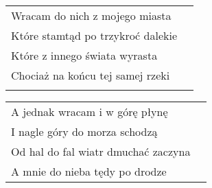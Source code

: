 \documentclass[a5paper]{article}
\begin{document}
\noindent
\begin{tabular}{@{}p{7.50cm}p{3cm}@{}}
Wracam do nich z mojego miasta \\
Które stamtąd po trzykroć dalekie \\
Które z innego świata wyrasta \\
Chociaż na końcu tej samej rzeki \\ \\
\end{tabular}

\noindent
\begin{tabular}{@{}p{6.50cm}p{3cm}@{}}
A jednak wracam i w górę płynę \\
I nagle góry do morza schodzą \\
Od hal do fal wiatr dmuchać zaczyna \\
A mnie do nieba tędy po drodze
\end{tabular}
\end{document}
